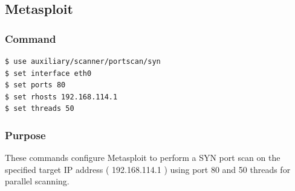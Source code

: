 \documentclass[11pt]{article}
\begin{document}
\subsection{Metasploit}

\subsubsection*{Command}
\begin{verbatim}
$ use auxiliary/scanner/portscan/syn
$ set interface eth0
$ set ports 80
$ set rhosts 192.168.114.1
$ set threads 50
\end{verbatim}

\subsubsection*{Purpose}
These commands configure Metasploit to perform a SYN port scan on the specified target IP address (
192.168.114.1 ) using port 80 and 50 threads for parallel scanning.
\end{document}
